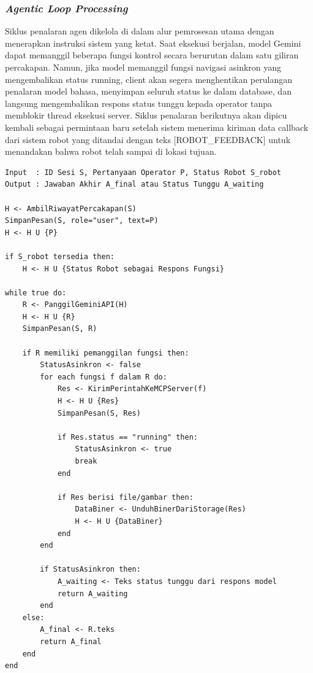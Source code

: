 \subsubsection{\textit{Agentic Loop Processing}}
Siklus penalaran agen dikelola di dalam alur pemrosesan utama dengan menerapkan instruksi sistem yang ketat. Saat eksekusi berjalan, model Gemini dapat memanggil beberapa fungsi kontrol secara berurutan dalam satu giliran percakapan. Namun, jika model memanggil fungsi navigasi asinkron yang mengembalikan status running, client akan segera menghentikan perulangan penalaran model bahasa, menyimpan seluruh status ke dalam database, dan langsung mengembalikan respons status tunggu kepada operator tanpa memblokir thread eksekusi server. Siklus penalaran berikutnya akan dipicu kembali sebagai permintaan baru setelah sistem menerima kiriman data callback dari sistem robot yang ditandai dengan teks [ROBOT\_FEEDBACK] untuk menandakan bahwa robot telah sampai di lokasi tujuan.

\begin{lstlisting}[caption={Agentic Loop Processing}, label={lst:siklus_penalaran_agen}]
Input  : ID Sesi S, Pertanyaan Operator P, Status Robot S_robot
Output : Jawaban Akhir A_final atau Status Tunggu A_waiting

H <- AmbilRiwayatPercakapan(S)
SimpanPesan(S, role="user", text=P)
H <- H U {P}

if S_robot tersedia then:
    H <- H U {Status Robot sebagai Respons Fungsi}

while true do:
    R <- PanggilGeminiAPI(H)
    H <- H U {R}
    SimpanPesan(S, R)
    
    if R memiliki pemanggilan fungsi then:
        StatusAsinkron <- false
        for each fungsi f dalam R do:
            Res <- KirimPerintahKeMCPServer(f)
            H <- H U {Res}
            SimpanPesan(S, Res)
            
            if Res.status == "running" then:
                StatusAsinkron <- true
                break
            end
            
            if Res berisi file/gambar then:
                DataBiner <- UnduhBinerDariStorage(Res)
                H <- H U {DataBiner}
            end
        end
        
        if StatusAsinkron then:
            A_waiting <- Teks status tunggu dari respons model
            return A_waiting
        end
    else:
        A_final <- R.teks
        return A_final
    end
end
\end{lstlisting}

